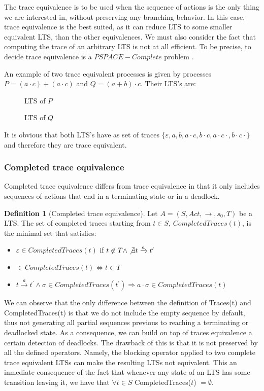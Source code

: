 \documentclass[11pt]{article}
\newcommand{\cmark}{\ding{51}}
\theoremstyle{definition}
\newtheorem{definition}{Definition}
\theoremstyle{plain}
\renewcommand{\epsilon}{\varepsilon}
\begin{document}
The trace equivalence is to be used when the sequence of actions is the only thing we are interested in, without preserving any branching behavior. In this case, trace equivalence is the best suited, as it can reduce LTS to some smaller equivalent LTS, than the other equivalences.
We must also consider the fact that computing the trace of an arbitrary LTS is not at all efficient. To be precise, to decide trace equivalence is a $ PSPACE-Complete $ problem \cite{KANELLAKIS199043}.

An example of two trace equivalent processes is given by processes $ P = (a\cdot c) + (a\cdot c) $ and $ Q = (a + b)\cdot c $. Their LTS's are:

\begin{figure} [H]
	\centering
	
	\caption{LTS of $P$} \label{fig:TraceEquivalenceP}
	\endminipage\hfill
	\centering
	
	\caption{LTS of $Q$} \label{fig:TraceEquivalenceQ}
	\endminipage\hfill
\end{figure}

It is obvious that both LTS's have as set of traces $ \{ \epsilon,a,b,a\cdot c,b\cdot c,a\cdot c\cdot $\cmark$,b\cdot c\cdot $\cmark$\} $ and therefore they are trace equivalent.

\subsubsection{Completed trace equivalence} 
Completed trace equivalence differs from trace equivalence in that it only includes sequences of actions that end in a terminating state or in a deadlock.
\begin{definition} [Completed trace equivalence]
	Let $ A = (S, Act, \rightarrow, s_0, T) $ be a LTS. The set of completed traces starting from $ t \in S $, $ CompletedTraces(t) $, is the minimal set that satisfies:
	\begin{itemize}
		\item $ \varepsilon \in CompletedTraces(t) $ if $ t \not \in T \wedge \not \exists t\xrightarrow{a}t^\prime $
		\item \cmark $\in CompletedTraces(t) \iff t \in T$
		\item $ t\xrightarrow{a}t^\prime  \wedge \sigma \in CompletedTraces(t^\prime ) \Rightarrow a\cdot\sigma \in CompletedTraces(t)$
	\end{itemize}
\end{definition}
We can observe that the only difference between the definition of Traces(t) and CompletedTraces(t) is that we do not include the empty sequence by default, thus not generating all partial sequences previous to reaching a terminating or deadlocked state.
As a consequence, we can build on top of traces equivalence a certain detection of deadlocks. The drawback of this is that it is not preserved by all the defined operators. Namely, the blocking operator applied to two complete trace equivalent LTSs can make the resulting LTSs not equivalent. This an inmediate consequence of the fact that whenever any state of an LTS has some transition leaving it, we have that $ \forall t \in S$ CompletedTraces($t$) $= \emptyset$.
\end{document}
